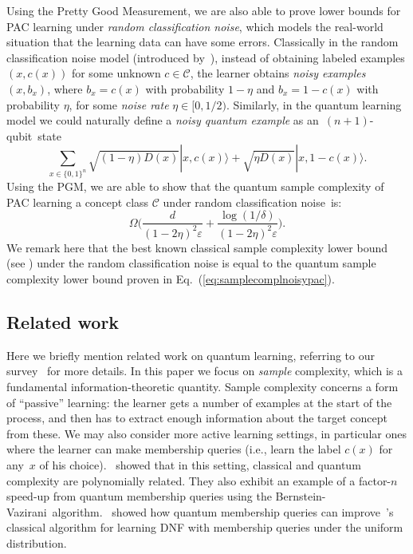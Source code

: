 \documentclass[twoside,11pt]{article}
\newcommand{\eps}{\varepsilon}
\newcommand{\ket}[1]{|#1\rangle}
\def\01{\{0,1\}}
\newcommand{\C}{\ensuremath{\mathscr{C}}}
\begin{document}
Using the Pretty Good Measurement, we are also able to prove lower bounds for PAC learning under \emph{random classification noise}, which models the real-world situation that the learning data can have some errors. Classically in the random classification noise model (introduced by~\cite{angluin:randomclassificationnoise}), instead of obtaining labeled examples $(x,c(x))$ for some unknown $c\in \C$, the learner obtains \emph{noisy examples} $(x,b_x)$, where $b_x=c(x)$ with probability $1-\eta$ and $b_x=1-c(x)$ with probability $\eta$, for some \emph{noise rate} $\eta\in [0,1/2)$. 
Similarly, in the quantum learning model we could naturally define a \emph{noisy quantum example} as an~$(n+1)$-qubit~state 
$$
\sum_{x\in\01^n}\sqrt{(1-\eta)D(x)}\ket{x,c(x)}+\sqrt{\eta D(x)}\ket{x,1-c(x)}.
$$ 
Using the PGM, we are able to show that the quantum sample complexity of PAC learning a concept class $\C$ under random classification noise~is:
\begin{equation}\label{eq:samplecomplnoisypac}
\Omega\Big(\frac{d}{(1-2\eta)^2\eps} + \frac{\log(1/\delta)}{(1-2\eta)^2\eps}\Big).
\end{equation}
We remark here that the best known classical sample complexity lower bound (see \cite{simon:agnosticlowerbound}) under the random classification noise is equal to the quantum sample complexity lower bound proven in Eq.~(\ref{eq:samplecomplnoisypac}).


\subsection{Related work}
Here we briefly mention related work on quantum learning, referring to our survey~\cite{arunachalam:quantumlearningsurvey} for more details. In this paper we focus on \emph{sample} complexity, which is a fundamental information-theoretic quantity. Sample complexity concerns a form of ``passive'' learning: the learner gets a number of examples at the start of the process, and then has to extract enough information about the target concept from these.  We may also consider more active learning settings, in particular ones where the learner can make membership queries (i.e., learn the label $c(x)$ for any~$x$ of his choice).~\cite{servedio&gortler:equivalencequantumclassical} showed that in this setting, classical and quantum complexity are polynomially related. They also exhibit an example of a factor-$n$ speed-up from quantum membership queries using the Bernstein-Vazirani~algorithm.~\cite{jackson:quantumdnf} showed how quantum membership queries can improve~\cite{jackson:dnf}'s classical algorithm for learning DNF with membership queries under the uniform distribution.
\end{document}
